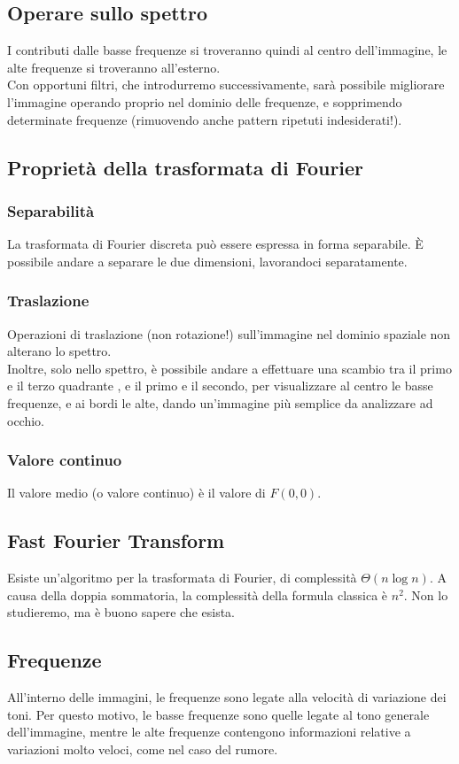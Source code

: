 \documentclass{report}
\begin{document}
	\subsection{Operare sullo spettro}
	I contributi dalle basse frequenze si troveranno quindi al centro dell'immagine, le alte frequenze si troveranno all'esterno. \\ 
	Con opportuni filtri, che introdurremo successivamente, sarà possibile migliorare l'immagine operando proprio nel dominio delle frequenze, e sopprimendo determinate frequenze (rimuovendo anche pattern ripetuti indesiderati!).
	\subsection{Proprietà della trasformata di Fourier}
	\subsubsection{Separabilità}
	La trasformata di Fourier discreta può essere espressa in forma separabile. È possibile andare a separare le due dimensioni, lavorandoci separatamente.
	\subsubsection{Traslazione}
	Operazioni di traslazione (non rotazione!) sull'immagine nel dominio spaziale non alterano lo spettro.\\
	Inoltre, solo nello spettro, è possibile andare a effettuare una scambio tra il primo e il terzo quadrante , e il primo e il secondo, per visualizzare al centro le basse frequenze, e ai bordi le alte, dando un'immagine più semplice da analizzare ad occhio.
	\subsubsection{Valore continuo}
	Il valore medio (o valore continuo) è il valore di $F(0,0)$.
	\subsection{Fast Fourier Transform}
	Esiste un'algoritmo per la trasformata di Fourier, di complessità $\Theta(n \log n)$. A causa della doppia sommatoria, la complessità della formula classica è $n^2$. Non lo studieremo, ma è buono sapere che esista.
	\subsection{Frequenze}
	All'interno delle immagini, le frequenze sono legate alla velocità di variazione dei toni. Per questo motivo, le basse frequenze sono quelle legate al tono generale dell'immagine, mentre le alte frequenze contengono informazioni relative a variazioni molto veloci, come nel caso del rumore.
\end{document}
